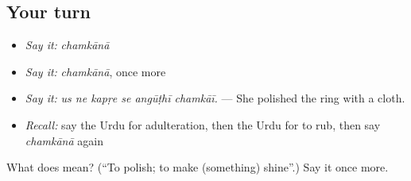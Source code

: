 \subsection*{Your turn}
\begin{itemize}
\raggedright
  \item \emph{Say it:} \emph{chamkānā}
  \item \emph{Say it:} \emph{chamkānā}, once more
  \item \emph{Say it:} \emph{us ne kapṛe se angūṭhī chamkāī.} — She polished the ring with a cloth.
  \item \emph{Recall:} say the Urdu for adulteration, then the Urdu for to rub, then say \emph{chamkānā} again
\end{itemize}

\begin{tcolorbox}[breakable,colback=teal!4,colframe=teal!35!black,title={Before you move on}]
What does  mean? (\textquotedblleft{}To polish; to make (something) shine\textquotedblright{}.) Say it once more.
\end{tcolorbox}

